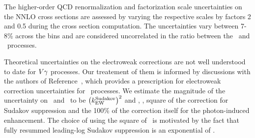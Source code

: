 The higher-order QCD renormalization and factorization scale uncertainties on the NNLO cross sections are assessed by varying the respective scales by factors 2 and 0.5 during the cross section computation. 
The uncertainties vary between 7-8\% across the bins and are considered uncorrelated in the ratio between the \zinvg\ and \wlng\ processes.

Theoretical uncertainties on the electroweak corrections are not well understood to date for $V\gamma$ processes.
Our treatement of them is informed by discussions with the authors of Reference~\cite{Lindert:2017olm}, which provides a prescription for electroweak correction uncertainties for \vj\ processes. 
We estimate the magnitude of the uncertainty on \ksudakov\ and \kphoton\ to be $\left(k_{\text{EW}}^{\text{Sudakov}}\right)^2$ and \kphoton, \ie, square of the correction for Sudakov suppression and the 100\% of the correction itself for the photon-induced enhancement. 
The choice of using the square of \ksudakov\ is motivated by the fact that fully resummed leading-log Sudakov suppression is an exponential of \ksudakov.

